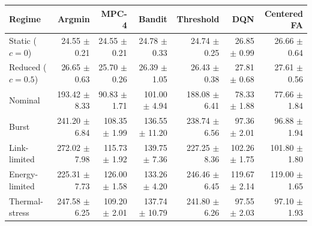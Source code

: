 \begin{tabular}{lrrrrrr}
\toprule
Regime & Argmin & MPC-4 & Bandit & Threshold & DQN & Centered FA \\
\midrule
Static ($c=0$) & 24.55 $\pm$ 0.21 & 24.55 $\pm$ 0.21 & 24.78 $\pm$ 0.33 & 24.74 $\pm$ 0.25 & 26.85 $\pm$ 0.99 & 26.66 $\pm$ 0.64 \\
Reduced ($c=0.5$) & 26.65 $\pm$ 0.63 & 25.70 $\pm$ 0.26 & 26.39 $\pm$ 1.05 & 26.43 $\pm$ 0.38 & 27.81 $\pm$ 0.68 & 27.61 $\pm$ 0.56 \\
Nominal & 193.42 $\pm$ 8.33 & 90.83 $\pm$ 1.71 & 101.00 $\pm$ 4.94 & 188.08 $\pm$ 6.41 & 78.33 $\pm$ 1.88 & 77.66 $\pm$ 1.84 \\
Burst & 241.20 $\pm$ 6.84 & 108.35 $\pm$ 1.99 & 136.55 $\pm$ 11.20 & 238.74 $\pm$ 6.56 & 97.36 $\pm$ 2.01 & 96.88 $\pm$ 1.94 \\
Link-limited & 272.02 $\pm$ 7.98 & 115.73 $\pm$ 1.92 & 139.75 $\pm$ 7.36 & 227.25 $\pm$ 8.36 & 102.26 $\pm$ 1.75 & 101.80 $\pm$ 1.80 \\
Energy-limited & 225.31 $\pm$ 7.73 & 126.00 $\pm$ 1.58 & 133.26 $\pm$ 4.20 & 246.46 $\pm$ 6.45 & 119.67 $\pm$ 2.14 & 119.00 $\pm$ 1.65 \\
Thermal-stress & 247.58 $\pm$ 6.25 & 109.20 $\pm$ 2.01 & 137.74 $\pm$ 10.79 & 241.80 $\pm$ 6.26 & 97.55 $\pm$ 2.03 & 97.10 $\pm$ 1.93 \\
\bottomrule
\end{tabular}